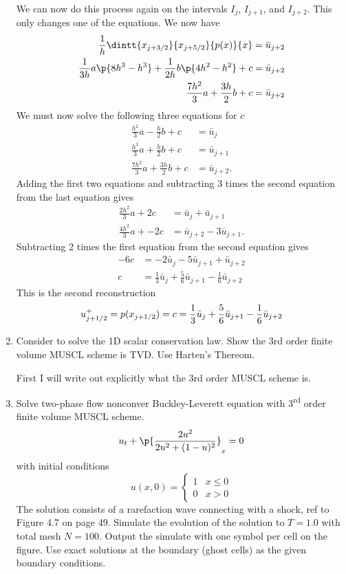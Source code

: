 \documentclass[11pt, oneside]{article}
\begin{document}
\begin{enumerate}
    We can now do this process again on the intervals $I_j$, $I_{j+1}$, and $I_{j+2}$.
    This only changes one of the equations.
    We now have
    \begin{align*}
      \frac{1}{h} \dintt{x_{j+3/2}}{x_{j+5/2}}{p(x)}{x} &= \bar{u}_{j+2} \\
      \frac{1}{3h}a \p{8h^3 - h^3} + \frac{1}{2h}b\p{4h^2 - h^2} + c &= \bar{u}_{j+2} \\
      \frac{7h^2}{3}a + \frac{3h}{2}b + c &= \bar{u}_{j+2}
    \end{align*}
    We must now solve the following three equations for $c$
    \begin{align*}
      \frac{h^2}{3}a - \frac{h}{2}b + c &= \bar{u}_{j} \\
      \frac{h^2}{3}a + \frac{h}{2}b + c &= \bar{u}_{j+1} \\
      \frac{7h^2}{3}a + \frac{3h}{2}b + c &= \bar{u}_{j+2}.
    \end{align*}
    Adding the first two equations and subtracting 3 times the second
    equation from the last equation gives
    \begin{align*}
      \frac{2h^2}{3}a + 2c &= \bar{u}_{j} + \bar{u}_{j+1} \\
      \frac{4h^2}{3}a + -2c &= \bar{u}_{j+2} - 3\bar{u}_{j+1}.
    \end{align*}
    Subtracting 2 times the first equation from the second equation gives
    \begin{align*}
      -6c &= -2\bar{u}_{j} - 5\bar{u}_{j+1} + \bar{u}_{j+2} \\
      c &= \frac{1}{3}\bar{u}_{j} + \frac{5}{6}\bar{u}_{j+1} - \frac{1}{6}\bar{u}_{j+2}
    \end{align*}
    This is the second reconstruction
    \[
      u^+_{j+1/2} = p(x_{j+1/2}) = c = \frac{1}{3}\bar{u}_{j} + \frac{5}{6}\bar{u}_{j+1} - \frac{1}{6}\bar{u}_{j+2} \\
    \]

  \item %
    Consider to solve the 1D scalar conservation law.
    Show the 3rd order finite volume MUSCL scheme is TVD.
    Use Harten's Thereom.

    First I will write out explicitly what the 3rd order MUSCL scheme is.

  \item %
    Solve two-phase flow nonconver Buckley-Leverett equation with
    3\textsuperscript{rd} order finite volume MUSCL scheme.
    \[
      u_t + \p{\frac{2u^2}{2u^2 + (1 - u)^2}}_x = 0
    \]
    with initial conditions
    \[
      u(x, 0) =
      \begin{cases}
        1 & x \le 0 \\
        0 & x > 0
      \end{cases}
    \]
    The solution consists of a rarefaction wave connecting with a shock, ref
    to Figure 4.7 on page 49.
    Simulate the evolution of the solution to $T = 1.0$ with total mesh
    $N = 100$.
    Output the simulate with one symbol per cell on the figure.
    Use exact solutions at the boundary (ghost cells) as the given boundary
    conditions.

\end{enumerate}
\end{document}
